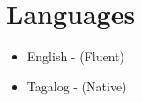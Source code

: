 \documentclass[letterpaper,11pt]{article}
\makeatletter
\newcommand{\resumeItem}[1]{\item\small{#1}}
\newcommand{\resumeSubheading}[4]{
  \vspace{-1pt}\item
    \begin{tabular*}{0.97\textwidth}[t]{l@{\extracolsep{\fill}}r}
      \textbf{#1} & #2 \\
      \textit{\small#3} & \textit{\small #4} \\
    \end{tabular*}\vspace{-5pt}
}
\newcommand{\resumeSubHeadingListStart}{\begin{itemize}[leftmargin=*]}
\newcommand{\resumeSubHeadingListEnd}{\end{itemize}}
\makeatother
\begin{document}




\section{Languages}
\resumeSubHeadingListStart
\resumeItem{English - (Fluent)} 
\resumeItem{Tagalog - (Native)}
\resumeSubHeadingListEnd
\end{document}
